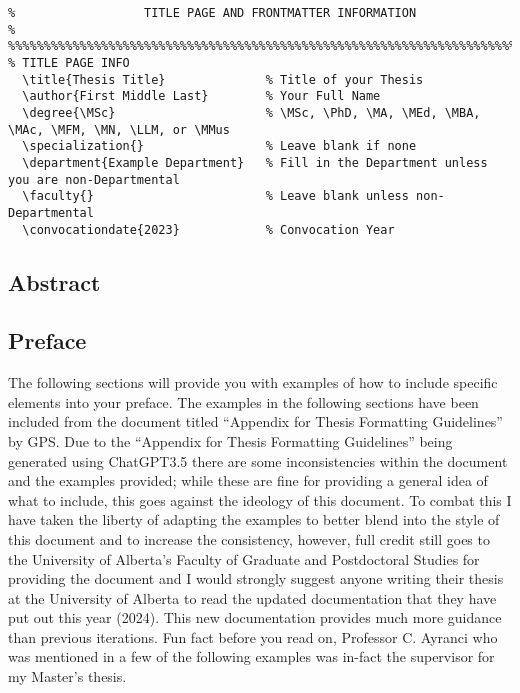 			\begin{lstlisting}[float=ht,caption=Example of How to Set Title Page Info,label=lst:TitlePage,style=LaTeXStyle,basicstyle=\scriptsize\ttfamily,]
%%%%%%%%%%%%%%%%%%%%%%%%%%%%%%%%%%%%%%%%%%%%%%%%%%%%%%%%%%%%%%%%%%%%%%%%%%%%%%%%
%                  TITLE PAGE AND FRONTMATTER INFORMATION                      %
%%%%%%%%%%%%%%%%%%%%%%%%%%%%%%%%%%%%%%%%%%%%%%%%%%%%%%%%%%%%%%%%%%%%%%%%%%%%%%%%
% TITLE PAGE INFO
  \title{Thesis Title}              % Title of your Thesis
  \author{First Middle Last}        % Your Full Name
  \degree{\MSc}                     % \MSc, \PhD, \MA, \MEd, \MBA, \MAc, \MFM, \MN, \LLM, or \MMus
  \specialization{}                 % Leave blank if none
  \department{Example Department}   % Fill in the Department unless you are non-Departmental
  \faculty{}                        % Leave blank unless non-Departmental
  \convocationdate{2023}            % Convocation Year
			\end{lstlisting}
	
		\subsection{Abstract}
			

		\subsection{Preface}
			The following sections will provide you with examples of how to include specific elements into your preface.
			The examples in the following sections have been included from the document titled ``Appendix for Thesis Formatting Guidelines'' by GPS\cite{FGPS2024}.
			Due to the ``Appendix for Thesis Formatting Guidelines'' being generated using ChatGPT3.5 there are some inconsistencies within the document and the examples provided; while these are fine for providing a general idea of what to include, this goes against the ideology of this document.
			To combat this I have taken the liberty of adapting the examples to better blend into the style of this document and to increase the consistency, however, full credit still goes to the University of Alberta's Faculty of Graduate and Postdoctoral Studies for providing the document and I would strongly suggest anyone writing their thesis at the University of Alberta to read the updated documentation that they have put out this year (2024).
			This new documentation provides much more guidance than previous iterations.
			Fun fact before you read on, Professor C. Ayranci who was mentioned in a few of the following examples was in-fact the supervisor for my Master's thesis.
			
